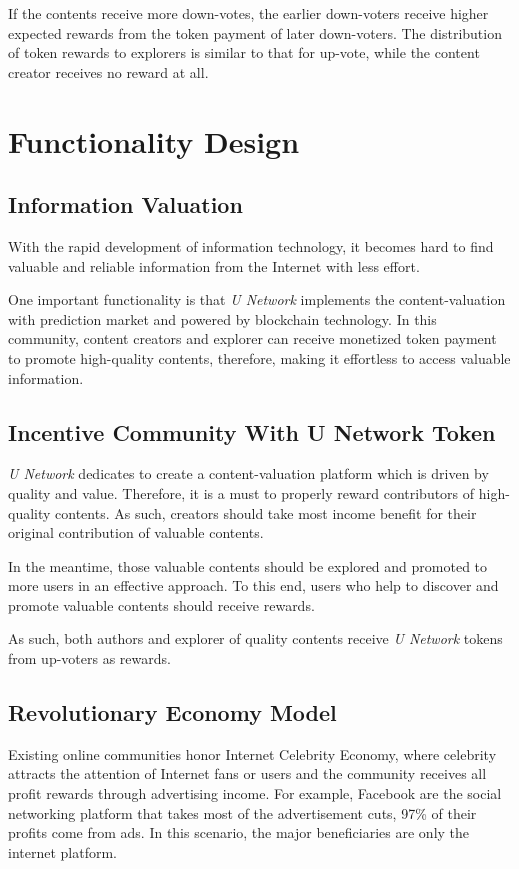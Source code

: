 If the contents receive more down-votes, the earlier down-voters receive higher expected rewards from the token payment of later down-voters. The distribution of token rewards to explorers is similar to that for up-vote, while the content creator receives no reward at all. 




\section{Functionality Design}
\subsection{ Information Valuation}
With the rapid development of information technology, it becomes hard to find valuable and reliable information from the Internet with less effort.  

One important functionality is that \emph{U Network} implements the content-valuation with prediction market and powered by blockchain technology. 
In this community, content creators and explorer can receive monetized token payment to promote high-quality contents, therefore, making it effortless to access valuable information.

\subsection{Incentive Community With U Network Token}
\emph{U Network} dedicates to create a content-valuation platform which is driven by quality and value. Therefore, it is a must to properly reward contributors of high-quality contents. As such, creators should take most income benefit for their original contribution of valuable contents.

In the meantime, those valuable contents should be explored and promoted to more users in an effective approach. To this end, users who help to discover and promote valuable contents should receive rewards. 

As such, both authors and explorer of quality contents receive \emph{U Network} tokens from up-voters as rewards. 

\subsection{Revolutionary Economy Model}	
Existing online communities honor Internet Celebrity Economy, where celebrity attracts the attention of Internet fans or users and the community receives all profit rewards through advertising income. For example, Facebook are the social networking platform that takes most of the advertisement cuts, 97\% of their profits come from ads. In this scenario, the major beneficiaries are only the internet platform.

